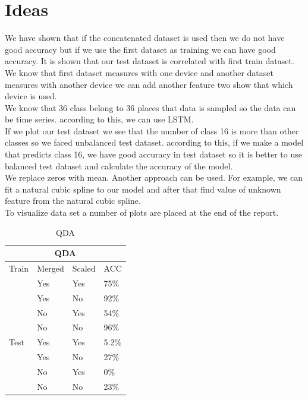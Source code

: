 \documentclass[17pt]{article}
\begin{document}
\section{Ideas}
We have shown that if the concatenated dataset is used then we do not have good accuracy but if we use the first dataset as training we can have good accuracy. It is shown that our test dataset is correlated with first train dataset. We know that first dataset measures with one device and another dataset measures with another device we can add another feature two show that which device is used.\\
We know that 36 class belong to 36 places that data is sampled so the data can be time series. according to this, we can use LSTM.\\
If we plot our test dataset we see that the number of class 16 is more than other classes so we faced unbalanced test dataset. according to this, if we make a model that predicts class 16, we have good accuracy in test dataset so it is better to use balanced test dataset and calculate the accuracy of the model.\\
We replace zeros with mean. Another approach can be used. For example, we can fit a natural cubic spline to our model and after that find value of unknown feature from the natural cubic spline.\\
To visualize data set a number of plots are placed at the end of the report.

\newpage
\begin{table}[]
	\caption{QDA}
	\centering
	\label{QDATable}
	\begin{tabular}{|l|l|l|l|}
		\hline
		\multicolumn{4}{|c|}{QDA}\\
		\cline{1-4}
		\hline
		Train & Merged & Scaled & ACC \\
		\cline{2-4}
		 &    Yes      &   Yes    & 75\%  \\
		\cline{2-4}
		&    Yes      &   No     & 92\%\\
		\cline{2-4}
		& No & Yes &  54\%\\
		\cline{2-4}
		& No & No & 96\%\\
		\hline
		
		Test & Yes & Yes & 5.2\% \\
		\cline{2-4}
		&    Yes      &   No     & 27\%\\
		\cline{2-4}
		& No & Yes & 0\% \\
		\cline{2-4}
		& No & No & 23\%\\
		\hline
	\end{tabular}
\end{table}
\end{document}
